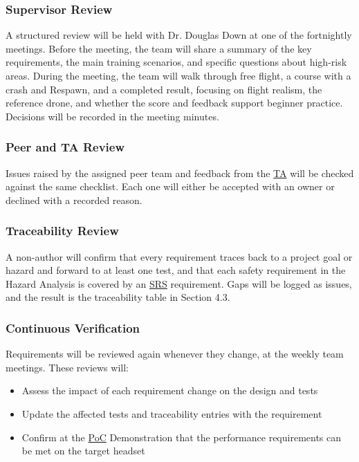 \documentclass[12pt, titlepage]{article}
\begin{document}
\subsubsection{Supervisor Review}

A structured review will be held with Dr. Douglas Down at one of the fortnightly
meetings. Before the meeting, the team will share a summary of the key requirements, the
main training scenarios, and specific questions about high-risk areas. During the
meeting, the team will walk through free flight, a course with a crash and Respawn, and a
completed result, focusing on flight realism, the reference drone, and whether the score
and feedback support beginner practice. Decisions will be recorded in the meeting
minutes.

\subsubsection{Peer and TA Review}

Issues raised by the assigned peer team and feedback from the \hyperlink{abbr:TA}{TA} will be checked against
the same checklist. Each one will either be accepted with an owner or declined with a
recorded reason.

\subsubsection{Traceability Review}

A non-author will confirm that every requirement traces back to a project goal or hazard
and forward to at least one test, and that each safety requirement in the Hazard
Analysis is covered by an \hyperlink{abbr:SRS}{SRS} requirement. Gaps will be logged as issues, and the result
is the traceability table in Section 4.3.

\subsubsection{Continuous Verification}

Requirements will be reviewed again whenever they change, at the weekly team meetings.
These reviews will:

\begin{itemize}
  \item Assess the impact of each requirement change on the design and tests
  \item Update the affected tests and traceability entries with the requirement
  \item Confirm at the \hyperlink{abbr:PoC}{PoC} Demonstration that the performance requirements can be met
  on the target headset
\end{itemize}
\end{document}
